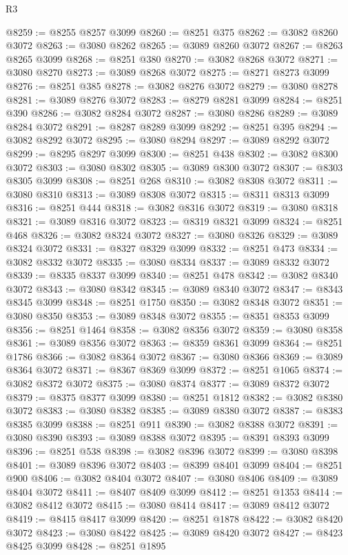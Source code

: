 \begin{lexlean}{R3}
\begin{coremodule}
@8259 := @8255 @8257 @3099
@8260 := @8251 @375
@8262 := @3082 @8260 @3072
@8263 := @3080 @8262
@8265 := @3089 @8260 @3072
@8267 := @8263 @8265 @3099
@8268 := @8251 @380
@8270 := @3082 @8268 @3072
@8271 := @3080 @8270
@8273 := @3089 @8268 @3072
@8275 := @8271 @8273 @3099
@8276 := @8251 @385
@8278 := @3082 @8276 @3072
@8279 := @3080 @8278
@8281 := @3089 @8276 @3072
@8283 := @8279 @8281 @3099
@8284 := @8251 @390
@8286 := @3082 @8284 @3072
@8287 := @3080 @8286
@8289 := @3089 @8284 @3072
@8291 := @8287 @8289 @3099
@8292 := @8251 @395
@8294 := @3082 @8292 @3072
@8295 := @3080 @8294
@8297 := @3089 @8292 @3072
@8299 := @8295 @8297 @3099
@8300 := @8251 @438
@8302 := @3082 @8300 @3072
@8303 := @3080 @8302
@8305 := @3089 @8300 @3072
@8307 := @8303 @8305 @3099
@8308 := @8251 @268
@8310 := @3082 @8308 @3072
@8311 := @3080 @8310
@8313 := @3089 @8308 @3072
@8315 := @8311 @8313 @3099
@8316 := @8251 @444
@8318 := @3082 @8316 @3072
@8319 := @3080 @8318
@8321 := @3089 @8316 @3072
@8323 := @8319 @8321 @3099
@8324 := @8251 @468
@8326 := @3082 @8324 @3072
@8327 := @3080 @8326
@8329 := @3089 @8324 @3072
@8331 := @8327 @8329 @3099
@8332 := @8251 @473
@8334 := @3082 @8332 @3072
@8335 := @3080 @8334
@8337 := @3089 @8332 @3072
@8339 := @8335 @8337 @3099
@8340 := @8251 @478
@8342 := @3082 @8340 @3072
@8343 := @3080 @8342
@8345 := @3089 @8340 @3072
@8347 := @8343 @8345 @3099
@8348 := @8251 @1750
@8350 := @3082 @8348 @3072
@8351 := @3080 @8350
@8353 := @3089 @8348 @3072
@8355 := @8351 @8353 @3099
@8356 := @8251 @1464
@8358 := @3082 @8356 @3072
@8359 := @3080 @8358
@8361 := @3089 @8356 @3072
@8363 := @8359 @8361 @3099
@8364 := @8251 @1786
@8366 := @3082 @8364 @3072
@8367 := @3080 @8366
@8369 := @3089 @8364 @3072
@8371 := @8367 @8369 @3099
@8372 := @8251 @1065
@8374 := @3082 @8372 @3072
@8375 := @3080 @8374
@8377 := @3089 @8372 @3072
@8379 := @8375 @8377 @3099
@8380 := @8251 @1812
@8382 := @3082 @8380 @3072
@8383 := @3080 @8382
@8385 := @3089 @8380 @3072
@8387 := @8383 @8385 @3099
@8388 := @8251 @911
@8390 := @3082 @8388 @3072
@8391 := @3080 @8390
@8393 := @3089 @8388 @3072
@8395 := @8391 @8393 @3099
@8396 := @8251 @538
@8398 := @3082 @8396 @3072
@8399 := @3080 @8398
@8401 := @3089 @8396 @3072
@8403 := @8399 @8401 @3099
@8404 := @8251 @900
@8406 := @3082 @8404 @3072
@8407 := @3080 @8406
@8409 := @3089 @8404 @3072
@8411 := @8407 @8409 @3099
@8412 := @8251 @1353
@8414 := @3082 @8412 @3072
@8415 := @3080 @8414
@8417 := @3089 @8412 @3072
@8419 := @8415 @8417 @3099
@8420 := @8251 @1878
@8422 := @3082 @8420 @3072
@8423 := @3080 @8422
@8425 := @3089 @8420 @3072
@8427 := @8423 @8425 @3099
@8428 := @8251 @1895

\end{coremodule}
\end{lexlean}
